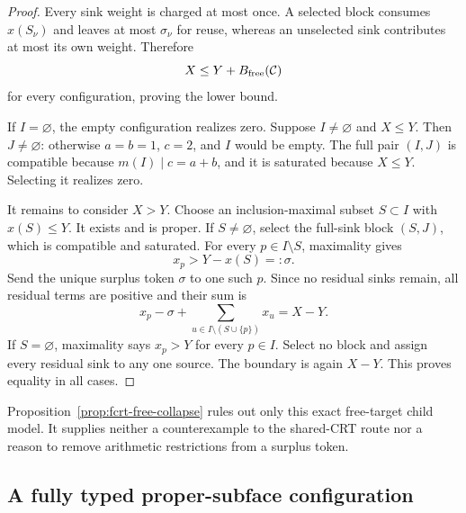 \begin{proof}
Every sink weight is charged at most once.  A selected block consumes
$x(S_\nu)$ and leaves at most $\sigma_\nu$ for reuse, whereas an unselected
sink contributes at most its own weight.  Therefore
\[
                       X\le Y+B_{\rm free}(\mathcal C)
\]
for every configuration, proving the lower bound.

If $I=\varnothing$, the empty configuration realizes zero.  Suppose
$I\ne\varnothing$ and $X\le Y$.  Then $J\ne\varnothing$: otherwise
$a=b=1$, $c=2$, and $I$ would be empty.  The full pair $(I,J)$ is compatible
because $m(I)\mid c=a+b$, and it is saturated because $X\le Y$.  Selecting
it realizes zero.

It remains to consider $X>Y$.  Choose an inclusion-maximal subset
$S\subset I$ with $x(S)\le Y$.  It exists and is proper.  If
$S\ne\varnothing$, select the full-sink block $(S,J)$, which is compatible
and saturated.  For every $p\in I\setminus S$, maximality gives
\[
                         x_p>Y-x(S)=:\sigma.
\tag{FCRT-9}\label{eq:fcrt-maximality}
\]
Send the unique surplus token $\sigma$ to one such $p$.  Since no residual
sinks remain, all residual terms are positive and their sum is
\[
 x_p-\sigma+\sum_{u\in I\setminus(S\cup\{p\})}x_u=X-Y.
\]
If $S=\varnothing$, maximality says $x_p>Y$ for every $p\in I$.
Select no block and assign every residual sink to any one source.  The
boundary is again $X-Y$.  This proves equality in all cases.
\end{proof}

Proposition~\ref{prop:fcrt-free-collapse} rules out only this exact
free-target child model.  It supplies neither a counterexample to the
shared-CRT route nor a reason to remove arithmetic restrictions from a
surplus token.

\subsection{A fully typed proper-subface configuration}

